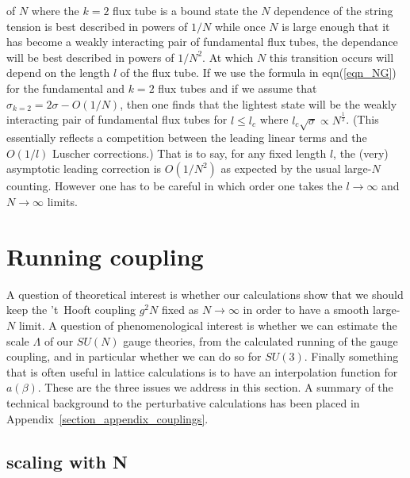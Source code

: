 \documentclass[12pt]{article}
\begin{document}
of $N$ where the $k=2$ flux tube is a bound state the $N$ dependence of the
string tension is best described in powers of $1/N$ while once $N$ is large enough
that it has become a weakly interacting pair of fundamental flux tubes, the dependance
will be best described in powers of $1/N^2$. At which $N$ this transition occurs will depend 
on the length $l$ of the flux tube. If we use the formula in eqn(\ref{eqn_NG}) for the
fundamental and $k=2$ flux tubes and if we assume that $\sigma_{k=2}=2\sigma - O(1/N)$,
then one finds that the lightest state will be the weakly interacting pair of fundamental 
flux tubes for $l\leq l_c$ where $l_c\surd\sigma \propto N^{\frac{1}{2}}$. (This essentially 
reflects a competition between the leading linear terms and the $O(1/l)$ Luscher corrections.)
That is to say, for any fixed length $l$,  the (very) asymptotic leading
correction is $O(1/N^2)$ as expected by the usual large-$N$ counting. However one has to
be careful in which order one takes the $l\to\infty$ and $N\to\infty$ limits.




%
%
%
%
\section{Running coupling}
\label{section_coupling}

A question of theoretical interest is whether our calculations show that  we should keep the
\mbox{'t Hooft} coupling $g^2N$ fixed as $N\to \infty$ in order to have a smooth large-$N$ limit.
A question of phenomenological interest is whether we can estimate the scale $\Lambda$
of our $SU(N)$ gauge theories, from the calculated running of the gauge coupling, and
in particular whether we can do so for $SU(3)$. Finally something that is often useful in
lattice calculations is to have an interpolation function for $a(\beta)$. These are
the three issues we address in this section. A summary of the technical background to the
perturbative calculations has been placed in Appendix~\ref{section_appendix_couplings}.


%
%
\subsection{scaling with N}
\label{subsection_couplingN}
\end{document}
